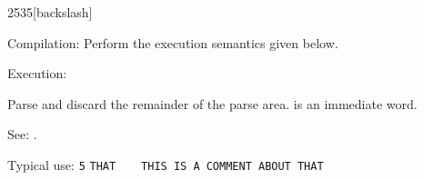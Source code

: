 \begin{newword*}[bs]{2535}{\bs}[backslash]
\item[Compilation:]
	Perform the execution semantics given below.

\item[Execution:]

	Parse and discard the remainder of the parse area.
	 is an immediate word.

\item[See:]
	.

	\begin{rationale} %
		Typical use:
			\texttt{5}  \texttt{THAT}
			~  ~ \texttt{THIS IS A COMMENT ABOUT THAT}
	\end{rationale}
\end{newword*}
